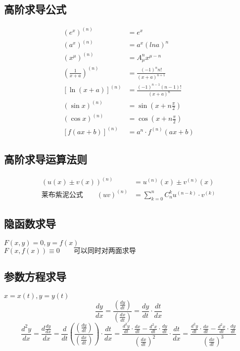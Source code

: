 \subsection{高阶求导公式}
\begin{align}
  \left(e^x\right)^{(n)}&=e^x\\
  \left(a^x\right)^{(n)}&=a^x\left(ln a\right)^n\\
  \left(x^\mu\right)^{(n)}&=A_\mu^nx^{\mu-n}\\
  \left(\frac{1}{x+a}\right)^{(n)}&=\frac{(-1)^nn!}{(x+a)^{n+1}}\\
  \left[\ln(x+a)\right]^{(n)}&=\frac{(-1)^{n-1}(n-1)!}{(x+a)^n}\\
  (\sin x)^{(n)}&=\sin(x+n\frac{\pi}{2})\\
  (\cos x)^{(n)}&=\cos(x+n\frac{\pi}{2})\\
  \left[f(ax+b)\right]^{(n)}&=a^n\cdot f^{(n)}(ax+b)
\end{align}
\subsection{高阶求导运算法则}
\begin{align}
  (u(x)\pm v(x))^{(n)}&=u^{(n)}(x)\pm v^{(n)}(x)\\
  \mbox{莱布紫泥公式}\qquad(uv)^{(n)}&=\sum_{k=0}^{n}C_{n}^{k}u^{(n-k)}\cdot v^(k)
\end{align}
\subsection{隐函数求导}
$F(x,y)=0,y=f(x)$\\
$F(x,f(x))\equiv 0\qquad\mbox{可以同时对两面求导}$
\subsection{参数方程求导}
$x=x(t),y=y(t)$
$$\frac{dy}{dx}=\frac{(\frac{dy}{dt})}{(\frac{dx}{dt})}=\frac{dy}{dt}\cdot\frac{dt}{dx}$$
$$\frac{d^2y}{dx}=\frac{d\frac{dy}{dx}}{dx}=\frac{d}{dt}\left(\frac{(\frac{dy}{dt})}{(\frac{dx}{dt})}\right)\cdot\frac{dt}{dx}=\frac{\frac{d^2y}{dt}\cdot\frac{dx}{dt}-\frac{d^2x}{dt}\cdot\frac{dy}{dt}}{(\frac{dx}{dt})^2}\cdot\frac{dt}{dx}=\frac{\frac{d^2y}{dt}\cdot\frac{dx}{dt}-\frac{d^2x}{dt}\cdot\frac{dy}{dt}}{(\frac{dx}{dt})^3}$$